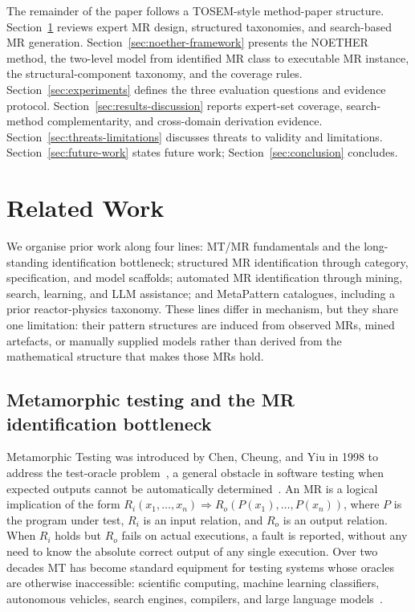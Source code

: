 \documentclass[acmsmall,screen,review]{acmart}
\begin{document}
The remainder of the paper follows a TOSEM-style method-paper structure. Section~\ref{sec:related} reviews expert MR design, structured taxonomies, and search-based MR generation. Section~\ref{sec:noether-framework} presents the NOETHER method, the two-level model from identified MR class to executable MR instance, the structural-component taxonomy, and the coverage rules. Section~\ref{sec:experiments} defines the three evaluation questions and evidence protocol. Section~\ref{sec:results-discussion} reports expert-set coverage, search-method complementarity, and cross-domain derivation evidence. Section~\ref{sec:threats-limitations} discusses threats to validity and limitations. Section~\ref{sec:future-work} states future work; Section~\ref{sec:conclusion} concludes.

\section{Related Work}
\label{sec:related}

We organise prior work along four lines: MT/MR fundamentals and the long-standing identification bottleneck; structured MR identification through category, specification, and model scaffolds; automated MR identification through mining, search, learning, and LLM assistance; and MetaPattern catalogues, including a prior reactor-physics taxonomy. These lines differ in mechanism, but they share one limitation: their pattern structures are induced from observed MRs, mined artefacts, or manually supplied models rather than derived from the mathematical structure that makes those MRs hold.

\subsection{Metamorphic testing and the MR identification bottleneck}

Metamorphic Testing was introduced by Chen, Cheung, and Yiu in 1998 to address the test-oracle problem~\cite{Chen1998}, a general obstacle in software testing when expected outputs cannot be automatically determined~\cite{Barr2015OracleProblem}. An MR is a logical implication of the form $R_i(x_1,\dots,x_n) \Rightarrow R_o(P(x_1),\dots,P(x_n))$, where $P$ is the program under test, $R_i$ is an input relation, and $R_o$ is an output relation. When $R_i$ holds but $R_o$ fails on actual executions, a fault is reported, without any need to know the absolute correct output of any single execution. Over two decades MT has become standard equipment for testing systems whose oracles are otherwise inaccessible: scientific computing, machine learning classifiers, autonomous vehicles, search engines, compilers, and large language models~\cite{Segura2016, LiTOSEM2025}.
\end{document}
